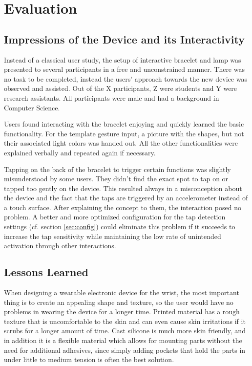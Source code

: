 \chapter{Evaluation}
\label{chap:evaluation}
\section{Impressions of the Device and its Interactivity}
Instead of a classical user study, the setup of interactive bracelet and lamp was presented to several participants in a free and unconstrained manner. There was no task to be completed, instead the users' approach towards the new device was observed and assisted. Out of the X participants, Z were students and Y were research assistants. All participants were male and had a background in Computer Science.

Users found interacting with the bracelet enjoying and quickly learned the basic functionality. For the template gesture input, a picture with the shapes, but not their associated light colors was handed out. All the other functionalities were explained verbally and repeated again if necessary.

Tapping on the back of the bracelet to trigger certain functions was slightly misunderstood by some users. They didn't find the exact spot to tap on or tapped too gently on the device. This resulted always in a misconception about the device and the fact that the taps are triggered by an accelerometer instead of a touch surface. After explaining the concept to them, the interaction posed no problem. A better and more optimized configuration for the tap detection settings (cf. section \ref{sec:config}) could eliminate this problem if it succeeds to increase the tap sensitivity while maintaining the low rate of unintended activation through other interactions.

\section{Lessons Learned}
When designing a wearable electronic device for the wrist, the most important thing is to create an appealing shape and texture, so the user would have no problems in wearing the device for a longer time. Printed material has a rough texture that is uncomfortable to the skin and can even cause skin irritations if it scrubs for a longer amount of time. Cast silicone is much more skin friendly, and in addition it is a flexible material which allows for mounting parts without the need for additional adhesives, since simply adding pockets that hold the parts in under little to medium tension is often the best solution.


